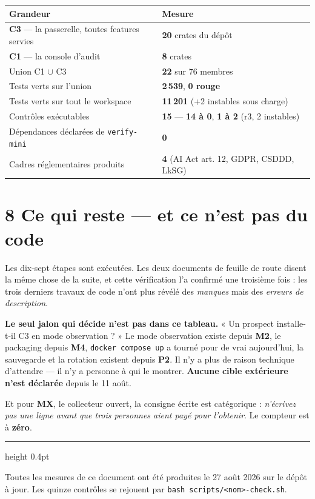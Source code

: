 \documentclass[11pt]{article}
\newcommand{\code}[1]{\texttt{\small #1}}
\newcommand{\best}[1]{{\color{efesolve}\textbf{#1}}}
\newcommand{\pire}[1]{{\color{efered}\textbf{#1}}}
\newcommand{\moyen}[1]{{\color{efeamber}\textbf{#1}}}
\newcommand{\mm}[1]{\textbf{#1}}
\newcommand{\sz}[1]{{\small #1}}
\begin{document}
\begin{center}\small
\renewcommand{\arraystretch}{1.2}
\begin{tabular}{@{}>{\raggedright\arraybackslash}p{6.6cm} l@{}}
\toprule
\textbf{Grandeur} & \textbf{Mesure} \\
\midrule
\mm{C3} --- la passerelle, toutes features servies & \textbf{20} crates du dépôt \\
\mm{C1} --- la console d'audit & \textbf{8} crates \\
Union C1 $\cup$ C3 & \textbf{22} sur 76 membres \\
Tests verts sur l'union & \textbf{2\,539}, \best{0 rouge} \\
Tests verts sur tout le workspace & \textbf{11\,201} \sz{(+2 instables sous charge)} \\
Contrôles exécutables & \textbf{15} --- \best{14 à 0}, \moyen{1 à 2} \sz{(r3, 2 instables)} \\
Dépendances déclarées de \code{verify-mini} & \textbf{0} \\
Cadres réglementaires produits & \textbf{4} \sz{(AI Act art. 12, GDPR, CSDDD, LkSG)} \\
\bottomrule
\end{tabular}
\end{center}

\section{8 \;\textbar\; Ce qui reste --- et ce n'est pas du code}

Les dix-sept étapes sont exécutées. Les deux documents de feuille de route disent la même chose de la
suite, et cette vérification l'a confirmé une troisième fois : les trois derniers travaux de code
n'ont plus révélé des \emph{manques} mais des \emph{erreurs de description}.

\begin{cadre}
\textbf{Le seul jalon qui décide n'est pas dans ce tableau.} « Un prospect installe-t-il C3 en mode
observation ? » Le mode observation existe depuis \mm{M2}, le packaging depuis \mm{M4},
\code{docker compose up} a tourné pour de vrai aujourd'hui, la sauvegarde et la rotation existent
depuis \mm{P2}. Il n'y a plus de raison technique d'attendre --- il n'y a personne à qui le montrer.
\textbf{Aucune cible extérieure n'est déclarée} depuis le 11 août.

Et pour \mm{MX}, le collecteur ouvert, la consigne écrite est catégorique : \emph{n'écrivez pas une
ligne avant que trois personnes aient payé pour l'obtenir}. Le compteur est à \pire{zéro}.
\end{cadre}

\vspace{4pt}
{\color{efegray}\hrule height 0.4pt}
\vspace{2.5pt}
{\footnotesize\color{efegray}Toutes les mesures de ce document ont été produites le 27 août 2026 sur
le dépôt à jour. Les quinze contrôles se rejouent par \code{bash scripts/<nom>-check.sh}.}
\end{document}

